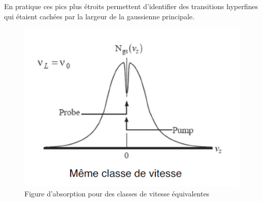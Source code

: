 En pratique ces pics plus étroits permettent d'identifier des transitions hyperfines qui étaient cachées par la largeur de la gaussienne principale.
\begin{figure}[htp]
    \centering
    \includegraphics[scale=1.0]{Images2/Vitesse1.PNG}
    \caption{Figure d'absorption pour des classes de vitesse équivalentes}
\label{fig:vit1}
\end{figure}







